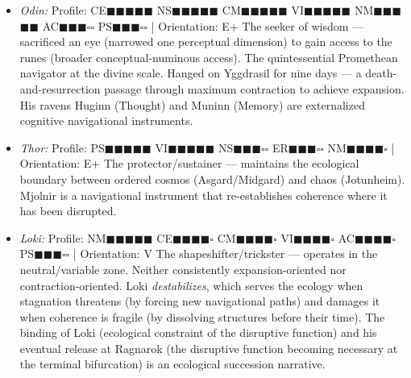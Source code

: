 \begin{itemize}[nosep,leftmargin=*]
  \item \textit{Odin:} Profile: CE$\blacksquare$$\blacksquare$$\blacksquare$$\blacksquare$$\blacksquare$ NS$\blacksquare$$\blacksquare$$\blacksquare$$\blacksquare$$\blacksquare$ CM$\blacksquare$$\blacksquare$$\blacksquare$$\blacksquare$$\blacksquare$ VI$\blacksquare$$\blacksquare$$\blacksquare$$\blacksquare$$\blacksquare$ NM$\blacksquare$$\blacksquare$$\blacksquare$$\blacksquare$$\blacksquare$ AC$\blacksquare$$\blacksquare$$\blacksquare$$\square$$\square$ PS$\blacksquare$$\blacksquare$$\blacksquare$$\square$$\square$ | Orientation: E+ The seeker of wisdom — sacrificed an eye (narrowed one perceptual dimension) to gain access to the runes (broader conceptual-numinous access). The quintessential Promethean navigator at the divine scale. Hanged on Yggdrasil for nine days — a death-and-resurrection passage through maximum contraction to achieve expansion. His ravens Huginn (Thought) and Muninn (Memory) are externalized cognitive navigational instruments.
  \item \textit{Thor:} Profile: PS$\blacksquare$$\blacksquare$$\blacksquare$$\blacksquare$$\blacksquare$ VI$\blacksquare$$\blacksquare$$\blacksquare$$\blacksquare$$\blacksquare$ NS$\blacksquare$$\blacksquare$$\blacksquare$$\square$$\square$ ER$\blacksquare$$\blacksquare$$\blacksquare$$\square$$\square$ NM$\blacksquare$$\blacksquare$$\blacksquare$$\blacksquare$$\square$ | Orientation: E+ The protector/sustainer — maintains the ecological boundary between ordered cosmos (Asgard/Midgard) and chaos (Jotunheim). Mjolnir is a navigational instrument that re-establishes coherence where it has been disrupted.
  \item \textit{Loki:} Profile: NM$\blacksquare$$\blacksquare$$\blacksquare$$\blacksquare$$\blacksquare$ CE$\blacksquare$$\blacksquare$$\blacksquare$$\blacksquare$$\square$ CM$\blacksquare$$\blacksquare$$\blacksquare$$\blacksquare$$\square$ VI$\blacksquare$$\blacksquare$$\blacksquare$$\blacksquare$$\square$ AC$\blacksquare$$\blacksquare$$\blacksquare$$\blacksquare$$\square$ PS$\blacksquare$$\blacksquare$$\blacksquare$$\square$$\square$ | Orientation: V The shapeshifter/trickster — operates in the neutral/variable zone. Neither consistently expansion-oriented nor contraction-oriented. Loki \textit{destabilizes}, which serves the ecology when stagnation threatens (by forcing new navigational paths) and damages it when coherence is fragile (by dissolving structures before their time). The binding of Loki (ecological constraint of the disruptive function) and his eventual release at Ragnarok (the disruptive function becoming necessary at the terminal bifurcation) is an ecological succession narrative.
\end{itemize}


